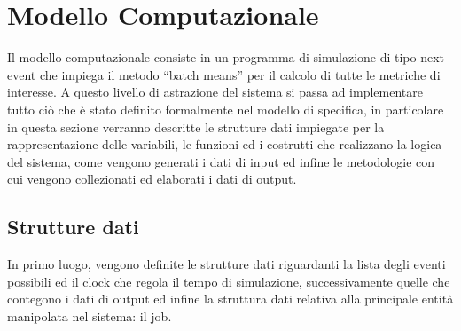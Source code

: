 \section{Modello Computazionale}
Il modello computazionale consiste in un programma di simulazione di tipo
next-event che impiega il metodo ``batch means'' per il calcolo di tutte le
metriche di interesse. 
A questo livello di astrazione del sistema si passa ad implementare tutto ciò
che è stato definito formalmente nel modello di specifica, in particolare in
questa sezione verranno descritte le strutture dati impiegate per la
rappresentazione delle variabili, le funzioni ed i costrutti che realizzano la
logica del sistema, come vengono generati i dati di input ed infine le
metodologie con cui vengono collezionati ed elaborati i dati di output.
%
%
\subsection{Strutture dati}
In primo luogo, vengono definite le strutture dati riguardanti la lista degli
eventi possibili ed il clock che regola il tempo di simulazione, successivamente
quelle che contegono i dati di output ed infine la struttura dati relativa alla
principale entità manipolata nel sistema: il job.
%
